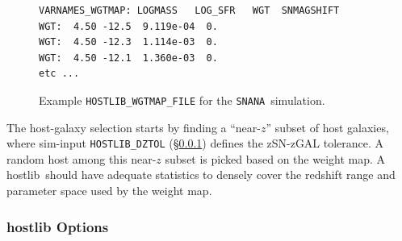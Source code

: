 \documentclass[12pt]{article}
\newcommand{\snana}{{\tt SNANA}}
\newcommand{\hostlib}{{\sc hostlib}}
\begin{document}
{\begin{figure}[!] 
\begin{center}
\caption{  Example {\tt HOSTLIB\_WGTMAP\_FILE} for the \snana\ simulation. }
\label{fig:hostlib_wgtmap}
\begin{Verbatim}[frame=single]
VARNAMES_WGTMAP: LOGMASS   LOG_SFR   WGT  SNMAGSHIFT
WGT:  4.50 -12.5  9.119e-04  0.
WGT:  4.50 -12.3  1.114e-03  0.
WGT:  4.50 -12.1  1.360e-03  0.
etc ...
\end{Verbatim}
\end{center}
\end{figure}

The host-galaxy selection starts by finding a ``near-$z$''
subset of host galaxies, where sim-input {\tt HOSTLIB\_DZTOL} 
(\S\ref{sss:hostlib_options})
defines the zSN-zGAL tolerance.
A random host among this near-$z$ subset is 
picked based on the weight map.
A \hostlib\ should have adequate statistics to densely
cover the redshift range and parameter space used by
the weight map.


\clearpage
\subsubsection{{\hostlib} Options}
\label{sss:hostlib_options}

}
\end{document}
